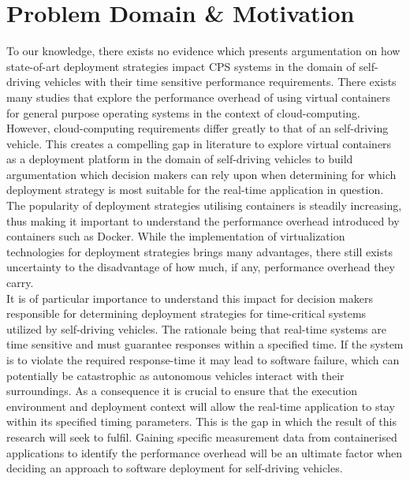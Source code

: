 
\section{Problem Domain \& Motivation}

To our knowledge, there exists no evidence which presents argumentation on how state-of-art deployment strategies impact CPS systems in the domain of self-driving vehicles with their time sensitive performance requirements. There exists many studies that explore the performance overhead of using virtual containers for general purpose operating systems in the context of cloud-computing. However, cloud-computing requirements differ greatly to that of an self-driving vehicle. This creates a compelling gap in literature to explore virtual containers as a deployment platform in the domain of self-driving vehicles to build argumentation which decision makers can rely upon when determining for which deployment strategy is most suitable for the real-time application in question. The popularity of deployment strategies utilising containers is steadily increasing, thus making it important to understand the performance overhead introduced by containers such as Docker. While the implementation of virtualization technologies for deployment strategies brings many advantages, there still exists uncertainty to the disadvantage of how much, if any, performance overhead they carry.\\

It is of particular importance to understand this impact for decision makers responsible for determining deployment strategies for time-critical systems utilized by self-driving vehicles. The rationale being that real-time systems are time sensitive and must guarantee responses within a specified time. If the system is to violate the required response-time it may lead to software failure, which can potentially be catastrophic as autonomous vehicles interact with their surroundings. As a consequence it is crucial to ensure that the execution environment and deployment context will allow the real-time application to stay within its specified timing parameters. This is the gap in which the result of this research will seek to fulfil. Gaining specific measurement data from containerised applications to identify the performance overhead will be an ultimate factor when deciding an approach to software deployment for self-driving vehicles.

